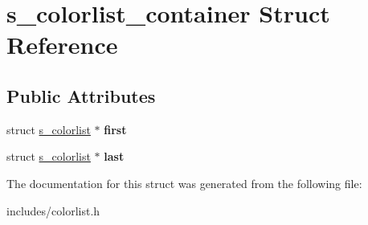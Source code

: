 \hypertarget{structs__colorlist__container}{}\section{s\+\_\+colorlist\+\_\+container Struct Reference}
\label{structs__colorlist__container}
\subsection*{Public Attributes}
\begin{DoxyCompactItemize}
\item 
\mbox{\label{structs__colorlist__container_ac7545c202db6b9e37c541ce6aa34926b}} 
struct \hyperlink{structs__colorlist}{s\+\_\+colorlist} $\ast$ {\bfseries first}
\item 
\mbox{\label{structs__colorlist__container_aaf558416cbcc7e4cb421a7ef6ef7b8e3}} 
struct \hyperlink{structs__colorlist}{s\+\_\+colorlist} $\ast$ {\bfseries last}
\end{DoxyCompactItemize}


The documentation for this struct was generated from the following file\+:\begin{DoxyCompactItemize}
\item 
includes/colorlist.\+h\end{DoxyCompactItemize}
